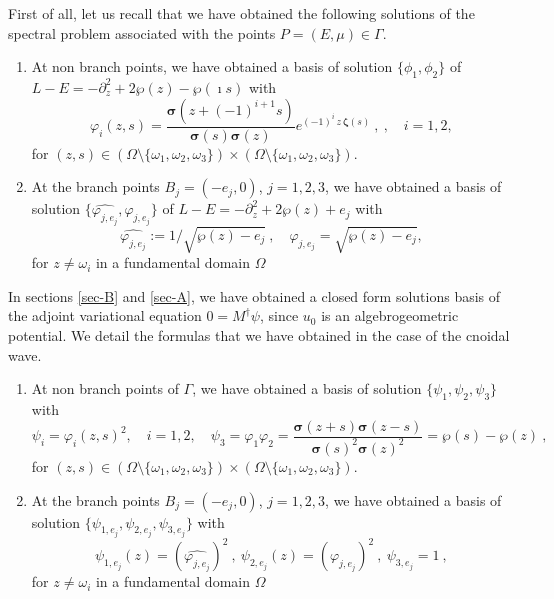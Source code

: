 \documentclass[a4paper,12pt]{article}
\begin{document}
First of all, let us recall that we have obtained the following solutions of the spectral problem associated with the points $P=(E,\mu)\in \Gamma$.

\begin{enumerate}
    \item At non branch points, we have obtained a basis of solution $\{ \phi_1 , \phi_2 \} $ of\break  $L-E=-\partial_z^2 +2\wp (z)-\wp (\imath s)$ with
    \begin{equation*}
        \varphi_i (z,s ) =\frac{{\bm \sigma} (z+(-1)^{i+1} s )}{{\bm \sigma} (s  ){\bm \sigma} (z)}e^{(-1)^{i} \, z \, {\bm\zeta} (s  )} \ ,   \ , \quad i =1, 2 ,
    \end{equation*}
    for $(z,s ) \in \left( \Omega\setminus \{ \omega_1 , \omega_2 ,\omega_3 \} \right)\times \left( \Omega\setminus \{ \omega_1 , \omega_2 ,\omega_3 \} \right)$.
    \item At the branch points $B_j = (-e_j , 0)$, $j=1, 2, 3$, we have obtained a basis of solution $\{  \widehat{\varphi_{j, e_j } } , \varphi_{j, e_j} \} $ of $L-E=-\partial_z^2 +2\wp (z)+ e_j $ with
    \begin{equation*}
         \widehat{\varphi_{j, e_j } }:=1/\sqrt{\wp(z)-{e_j }} \ , \quad \varphi_{j, e_j } = \sqrt{\wp(z)-{e_j }},
    \end{equation*}
    for $z\not= \omega_i $ in a fundamental domain $\Omega$
\end{enumerate}

\color{black}









In sections  \ref{sec-B} and \ref{sec-A}, we have obtained a closed form solutions basis of the adjoint variational equation $0 = M^\dag \psi$, since $u_0$ is an algebrogeometric potential. We detail the formulas that we have obtained in the case of the cnoidal wave.

\begin{enumerate}
    \item At non branch points of $\Gamma$, we have obtained a basis of solution $\{ \psi_1 , \psi_2 , \psi_3 \} $  with
    \begin{equation*}
       \psi_i = \varphi_i (z,s )^2  , \quad i =1, 2 , \quad \psi_3 = \varphi_1  \varphi_2  =\frac{{\bm \sigma} (z+ s ){\bm \sigma} (z- s )}{{\bm \sigma} (s  )^2 {\bm \sigma} (z)^2 } =\wp (s)-\wp (z)\ ,
    \end{equation*}
    for $(z,s ) \in \left( \Omega\setminus \{ \omega_1 , \omega_2 ,\omega_3 \} \right)\times \left( \Omega\setminus \{ \omega_1 , \omega_2 ,\omega_3 \} \right)$. 
    \item At the branch points $B_j = (-e_j , 0)$, $j=1, 2, 3$, we have obtained a basis of solution $\{ \psi_{1, e_j } , \psi_{2, e_j } , \psi_{3, e_j } \} $  with
    \begin{equation*}
        \psi_{1, e_j } (z)= ( \widehat{\varphi_{j, e_j } } )^2 \ , \  \psi_{2, e_j } (z) = (\varphi_{j, e_j } )^2  \  , \  \psi_{3, e_j }=1 \ ,
    \end{equation*}
    for $z\not= \omega_i $ in a fundamental domain $\Omega$
\end{enumerate}
\end{document}
